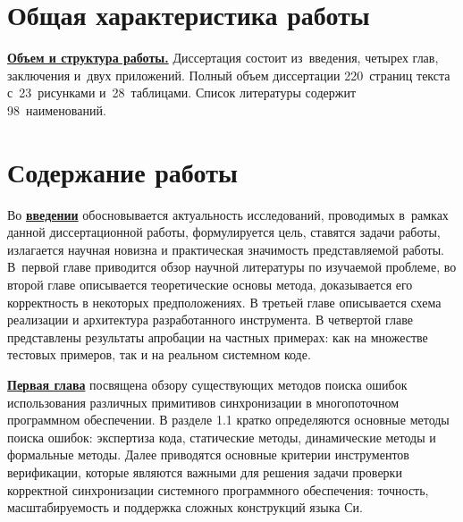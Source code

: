 
\section*{Общая характеристика работы}

\newcommand{\actuality}{\underline{\textbf{\actualityTXT}}}
\newcommand{\progress}{\underline{\textbf{\progressTXT}}}
\newcommand{\aim}{{\textbf\aimTXT}}
\newcommand{\aimandtasks}{\underline{{\textbf\aimandtasksTXT}}}
\newcommand{\tasks}{\textbf{\tasksTXT}}
\newcommand{\novelty}{\underline{\textbf{\noveltyTXT}}}
\newcommand{\influence}{\underline{\textbf{\influenceTXT}}}
\newcommand{\methods}{\underline{\textbf{\methodsTXT}}}
\newcommand{\defpositions}{\underline{\textbf{\defpositionsTXT}}}
\newcommand{\reliability}{\underline{\textbf{\reliabilityTXT}}}
\newcommand{\probation}{\underline{\textbf{\probationTXT}}}
\newcommand{\contribution}{\underline{\textbf{\contributionTXT}}}
\newcommand{\publications}{\underline{\textbf{\publicationsTXT}}}


\underline{\textbf{Объем и структура работы.}} Диссертация состоит из~введения, четырех глав, заключения и~двух приложений. Полный объем диссертации 220~страниц текста с~23~рисунками и~28~таблицами. Список литературы содержит 98~наименований.

\section*{Содержание работы}
Во \underline{\textbf{введении}} обосновывается актуальность
исследований, проводимых в~рамках данной диссертационной работы,
формулируется цель, ставятся задачи работы, излагается научная новизна
и практическая значимость представляемой работы.
В~первой главе приводится обзор научной литературы по изучаемой проблеме, во второй главе описывается теоретические основы метода, доказывается его корректность в некоторых предположениях.
В третьей главе описывается схема реализации и архитектура разработанного инструмента.
В четвертой главе представлены результаты апробации на частных примерах: как на множестве тестовых примеров, так и на реальном системном коде.

\underline{\textbf{Первая глава}} посвящена обзору существующих методов поиска ошибок использования различных примитивов синхронизации в многопоточном программном обеспечении.
В разделе 1.1 кратко определяются основные методы поиска ошибок: экспертиза кода, статические методы, динамические методы и формальные методы.
Далее приводятся основные критерии инструментов верификации, которые являются важными для решения задачи проверки корректной синхронизации системного программного обеспечения: точность, масштабируемость и поддержка сложных конструкций языка Си.

